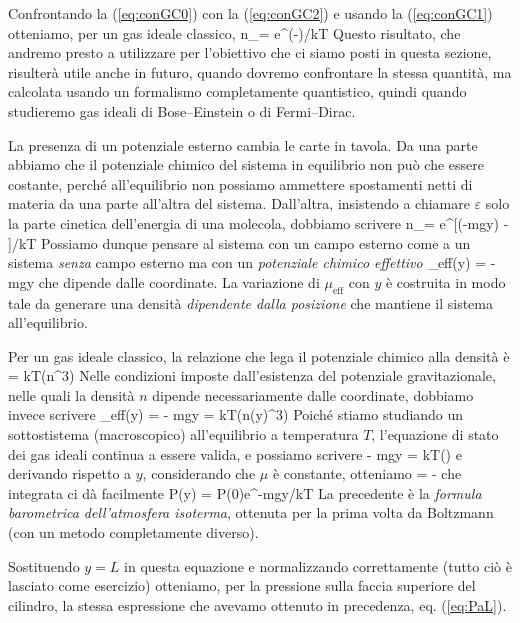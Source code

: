 Confrontando la (\ref{eq:conGC0}) con la (\ref{eq:conGC2}) e usando la (\ref{eq:conGC1}) otteniamo, per un gas ideale classico,
\be
\langle n_\varepsilon\rangle = e^{(\mu-\varepsilon)/kT}
\ee
Questo risultato, che andremo presto a utilizzare per l'obiettivo che ci siamo posti in questa sezione, risulterà utile anche in futuro, quando dovremo confrontare la stessa quantità, ma calcolata usando un formalismo completamente quantistico, quindi quando studieremo gas ideali di Bose--Einstein o di Fermi--Dirac.

La presenza di un potenziale esterno cambia le carte in tavola. Da una parte abbiamo che il potenziale chimico del sistema in equilibrio non può che essere costante, perché all'equilibrio non possiamo ammettere spostamenti netti di materia da una parte all'altra del sistema. Dall'altra, insistendo a chiamare $\varepsilon$ solo la parte cinetica dell'energia di una molecola, dobbiamo scrivere
\be
\langle n_\varepsilon\rangle = e^{[(\mu-mgy) - \varepsilon]/kT}
\ee
Possiamo dunque pensare al sistema con un campo esterno come a un sistema {\em senza} campo esterno ma con un {\em potenziale chimico effettivo}
\be
\mu_{\textrm{eff}}(y) = \mu - mgy
\ee
che dipende dalle coordinate. La variazione di $\mu_{\textrm{eff}}$ con $y$ è costruita in modo tale da generare una densità {\em dipendente dalla posizione} che mantiene il sistema all'equilibrio.

Per un gas ideale classico, la relazione che lega il potenziale chimico alla densità è
\be
\mu = kT\ln(n\lambda^3)
\ee
Nelle condizioni imposte dall'esistenza del potenziale gravitazionale, nelle quali la densità $n$ dipende necessariamente dalle coordinate, dobbiamo invece scrivere
\be
\mu_{\textrm{eff}}(y) = \mu - mgy = kT\ln(n(y)\lambda^3)
\ee
Poiché stiamo studiando un sottostistema (macroscopico) all'equilibrio a temperatura $T$, l'equazione di stato dei gas ideali continua a essere valida, e possiamo scrivere
\be
\mu - mgy = kT\ln\left(\right)
\ee
e derivando rispetto a $y$, considerando che $\mu$ è constante, otteniamo
\be
{} = -
\ee
che integrata ci dà facilmente
\be
P(y) = P(0)e^{-mgy/kT}
\ee
La precedente è la {\em formula barometrica dell'atmosfera isoterma}, ottenuta per la prima volta da Boltzmann (con un metodo completamente diverso).

Sostituendo $y = L$ in questa equazione e normalizzando correttamente (tutto ciò è lasciato come esercizio) otteniamo, per la pressione sulla faccia superiore del cilindro, la stessa espressione che avevamo ottenuto in precedenza, eq. (\ref{eq:PaL}).